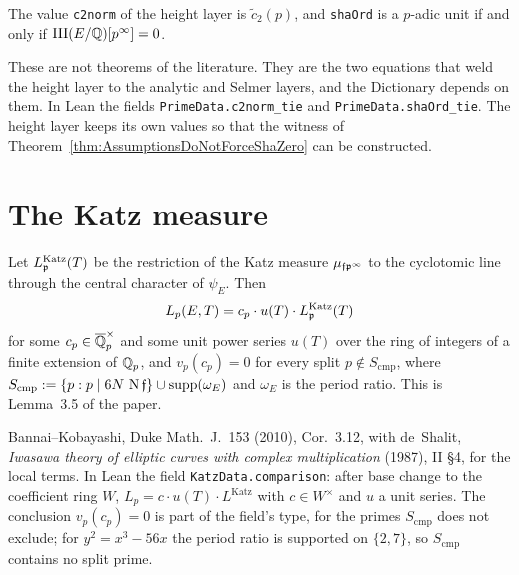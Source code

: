 \begin{assumption}
  \label{assum:ProxyTies}
  \leanok
  The value \texttt{c2norm} of the height layer is $\tilde c_2(p)$, and
  \texttt{shaOrd} is a $p$-adic unit if and only if
  $\mathrm{III}(E/\mathbb{Q})[p^\infty] = 0$.

  These are not theorems of the literature. They are the two equations that
  weld the height layer to the analytic and Selmer layers, and the
  Dictionary depends on them. In Lean the fields
  \texttt{PrimeData.c2norm\_tie} and \texttt{PrimeData.shaOrd\_tie}. The
  height layer keeps its own values so that the witness of
  Theorem~\ref{thm:AssumptionsDoNotForceShaZero} can be constructed.
\end{assumption}

\section{The Katz measure}

\begin{assumption}
  \label{assum:KatzComparison}
  \leanok
  Let $L^{\mathrm{Katz}}_{\mathfrak{p}}(T)$ be the restriction of the Katz measure
  $\mu_{{\mathfrak{f}}{\mathfrak{p}}^\infty}$ to the cyclotomic line through the central character
  of $\psi_E$. Then
  \[
    L_p(E,T) = c_p \cdot u(T) \cdot L^{\mathrm{Katz}}_{\mathfrak{p}}(T)
  \]
  for some $c_p \in \overline{\mathbb{Q}}_p^\times$ and some unit power series
  $u(T)$ over the ring of integers of a finite extension of $\mathbb{Q}_p$, and
  $v_p(c_p) = 0$ for every split $p \notin S_{\mathrm{cmp}}$, where
  $S_{\mathrm{cmp}} := \{p : p \mid 6N\,\operatorname{N}{\mathfrak{f}}\} \cup
  \operatorname{supp}(\omega_E)$ and $\omega_E$ is the period ratio. This is
  Lemma~3.5 of the paper.

  Bannai--Kobayashi, Duke Math.\ J.\ 153 (2010), Cor.~3.12, with de~Shalit,
  \emph{Iwasawa theory of elliptic curves with complex multiplication}
  (1987), II \S 4, for the local terms. In Lean the field
  \texttt{KatzData.comparison}: after base change to the coefficient ring
  $W$, $L_p = c \cdot u(T) \cdot L^{\mathrm{Katz}}$ with $c \in W^\times$ and
  $u$ a unit series. The conclusion $v_p(c_p) = 0$ is part of the field's
  type, for the primes $S_{\mathrm{cmp}}$ does not exclude; for
  $y^2 = x^3 - 56x$ the period ratio is supported on $\{2, 7\}$, so
  $S_{\mathrm{cmp}}$ contains no split prime.
\end{assumption}

